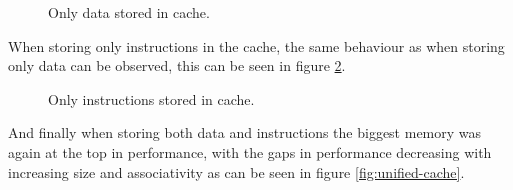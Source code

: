 \documentclass[titlepage, a4paper]{article}
\begin{document}
\begin{figure}[H]
	\centering
	\caption{Only data stored in cache.}
	\label{fig:data-cache}
\end{figure}

When storing only instructions in the cache, the same behaviour as when storing only data can be observed, this can be seen in figure \ref{fig:instruction-cache}.

\begin{figure}[H]
	\centering
	\caption{Only instructions stored in cache.}
	\label{fig:instruction-cache}
\end{figure}

And finally when storing both data and instructions the biggest memory was again at the top in performance, with the gaps in performance decreasing with increasing size and associativity as can be seen in figure \ref{fig:unified-cache}.
\end{document}

